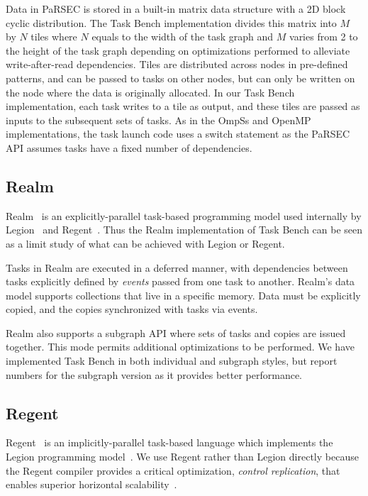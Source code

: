 Data in PaRSEC is stored in a built-in matrix data structure with a 2D
block cyclic distribution.  The Task Bench implementation divides this
matrix into $M$ by $N$ tiles where $N$ equals to the width of the task
graph and $M$ varies from 2 to the height of the task graph depending
on optimizations performed to alleviate write-after-read dependencies.
Tiles are distributed across nodes in pre-defined patterns,
and can be passed to tasks on other nodes, but
can only be written on the node where the data is originally
allocated. In our Task Bench implementation, each task writes to a
tile as output, and these tiles are passed as inputs to the
subsequent sets of tasks. As in the OmpSs and OpenMP implementations,
the task launch code uses a switch statement as the PaRSEC API assumes
tasks have a fixed number of dependencies.

\subsection{Realm}

Realm~\cite{Realm14} is an explicitly-parallel task-based programming
model used internally by Legion~\cite{Legion12} and
Regent~\cite{Regent15}. Thus the Realm implementation of Task Bench can be
seen as a limit study of what can be achieved with Legion or Regent.

Tasks in Realm are executed in a deferred manner, with dependencies
between tasks explicitly defined by \emph{events} passed from one task
to another. Realm's data model supports collections that live in a
specific memory. Data must be explicitly copied, and the copies
synchronized with tasks via events.

Realm also supports a subgraph API where sets of tasks and copies are
issued together. This mode permits additional optimizations to be
performed. We have implemented Task Bench in both individual and
subgraph styles, but report numbers for the subgraph version as it
provides better performance.

\subsection{Regent}

Regent~\cite{Regent15} is an implicitly-parallel task-based language
which implements the Legion programming model~\cite{Legion12}. We use
Regent rather than Legion directly because the Regent compiler
provides a critical optimization, \emph{control replication}, that
enables superior horizontal scalability~\cite{ControlReplication17}.

